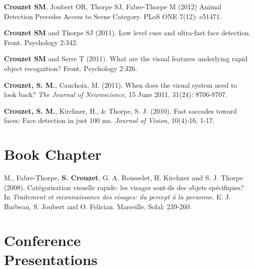 \documentclass[margin,line]{resume}
\begin{document}
\begin{resume}
	\vspace{-2mm} \textbf{Crouzet SM}, Joubert OR, Thorpe SJ, Fabre-Thorpe M (2012) Animal Detection Precedes Access to Scene Category. PLoS ONE 7(12): e51471.

	\vspace{-2mm} \textbf{Crouzet SM} and Thorpe SJ (2011). Low level cues and ultra-fast face detection. Front. Psychology 2:342.

	\vspace{-2mm} \textbf{Crouzet SM} and Serre T (2011). What are the visual features underlying rapid object recognition? Front. Psychology 2:326.

	\vspace{-2mm} \textbf{Crouzet, S. M.}, Cauchoix, M. (2011). When does the visual system need to look back?  \textit{The Journal of Neuroscience}, 15 June 2011, 31(24): 8706-8707.

	\vspace{-2mm} \textbf{Crouzet, S. M.}, Kirchner, H., \& Thorpe, S. J.  (2010). Fast saccades toward faces: Face detection in just 100 ms. \textit{Journal of Vision}, 10(4):16, 1-17.
		


	\vspace{3mm}	
    \section{\mysidestyle Book Chapter}

M., Fabre-Thorpe, \textbf{S. Crouzet}, G. A. Rousselet, H. Kirchner and S. J. Thorpe (2008). Catégorisation visuelle rapide: les visages sont-ils des objets spécifiques? In \textsl{Traitement et reconnaissance des visages: du percept à la personne}. E. J. Barbeau, S. Joubert and O. Felician. Marseille, Solal: 239-260.

	\vspace{3mm}	
    \section{\mysidestyle Conference\\Presentations}

\footnotesize %


\end{resume}
\end{document}
